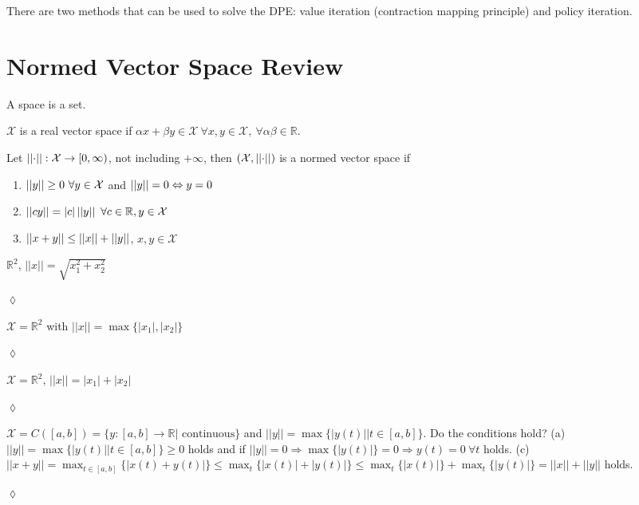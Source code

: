 There are two methods that can be used to solve the DPE: value iteration (contraction mapping principle) and policy iteration.

\section{Normed Vector Space Review}
\begin{definition}
A space is a set.
\end{definition}

\begin{definition}
$\mathcal{X}$ is a real vector space if $\alpha x+\beta y\in\mathcal{X} ~\forall x,y\in\mathcal{X}, ~\forall \alpha\beta\in\mathbb{R}$.
\end{definition}

\begin{definition}
Let $\left|\left|\cdot\right|\right|: \mathcal{X}\to[0,\infty)$, not including $+\infty$, then $(\mathcal{X},\left|\left|\cdot\right|\right|)$ is a normed vector space if
\begin{enumerate}
\item $\left|\left|y\right|\right|\geq0 ~\forall y\in\mathcal{X}$ and $\left|\left|y\right|\right|=0\Leftrightarrow y=0$
\item $||cy|| = |c|\left|\left|y\right|\right| ~\forall c\in\mathbb{R}, y\in\mathcal{X}$
\item $\left|\left|x+y\right|\right|\leq ||x|| + ||y||$, $x,y\in\mathcal{X}$
\end{enumerate}
\end{definition}

\begin{example}
$\mathbb{R}^2$, $||x||=\sqrt{x_1^2+x_2^2}$
\end{example}
$\lozenge$

\begin{example}
$\mathcal{X}=\mathbb{R}^2$ with $||x|| = \max\{|x_1|,|x_2|\}$
\end{example}
$\lozenge$

\begin{example}
$\mathcal{X} = \mathbb{R}^2$, $||x||=|x_1|+|x_2|$
\end{example}
$\lozenge$

\begin{example}
$\mathcal{X} = C([a,b]) = \{y:[a,b]\to\mathbb{R} | \text{ continuous}\}$ and $||y|| = \max\{|y(t)| | t\in[a,b]\}$. Do the conditions hold?
\newline
(a) $||y|| = \max\{|y(t)| | t\in[a,b]\}\geq 0$ holds and if $||y||=0 \Rightarrow \max\{|y(t)|\} = 0 \Rightarrow y(t)=0 ~\forall t$ holds.
\newline
(c) $||x+y|| = \max_{t\in[a,b]}\{|x(t)+y(t)|\} \leq \max_t\{|x(t)|+|y(t)|\} \leq \max_t\{|x(t)|\} + \max_t\{|y(t)|\} = ||x|| + ||y||$ holds.
\end{example}
$\lozenge$

